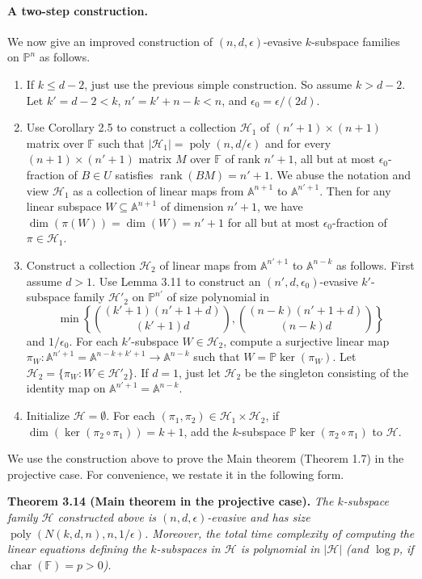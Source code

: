 \documentclass[10pt,a4paper]{article}
\newcommand{\FF}{\mathbb F}
\newcommand{\PP}{\mathbb P}
\newcommand{\Aspace}{\mathbb A}
\newenvironment{result}[1]{\par\medskip\noindent\textbf{#1.}\itshape}{\par\medskip}
\begin{document}
\paragraph{A two-step construction.}
We now give an improved construction of $(n,d,\epsilon)$-evasive $k$-subspace families on $\PP^n$ as follows.
\begin{enumerate}
\item If $k\le d-2$, just use the previous simple construction. So assume $k>d-2$. Let $k'=d-2<k$, $n'=k'+n-k<n$, and $\epsilon_0=\epsilon/(2d)$.
\item Use Corollary 2.5 to construct a collection $\mathcal H_1$ of $(n'+1)\times(n+1)$ matrix over $\FF$ such that $|\mathcal H_1|=\operatorname{poly}(n,d/\epsilon)$ and for every $(n+1)\times(n'+1)$ matrix $M$ over $\FF$ of rank $n'+1$, all but at most $\epsilon_0$-fraction of $B\in U$ satisfies $\operatorname{rank}(BM)=n'+1$.
We abuse the notation and view $\mathcal H_1$ as a collection of linear maps from $\Aspace^{n+1}$ to $\Aspace^{n'+1}$. Then for any linear subspace $W\subseteq\Aspace^{n+1}$ of dimension $n'+1$, we have $\dim(\pi(W))=\dim(W)=n'+1$ for all but at most $\epsilon_0$-fraction of $\pi\in\mathcal H_1$.
\item Construct a collection $\mathcal H_2$ of linear maps from $\Aspace^{n'+1}$ to $\Aspace^{n-k}$ as follows. First assume $d>1$. Use Lemma 3.11 to construct an $(n',d,\epsilon_0)$-evasive $k'$-subspace family $\mathcal H'_2$ on $\PP^{n'}$ of size polynomial in
\[\min\left\{\binom{(k'+1)(n'+1+d)}{(k'+1)d},\binom{(n-k)(n'+1+d)}{(n-k)d}\right\}\]
and $1/\epsilon_0$. For each $k'$-subspace $W\in\mathcal H_2$, compute a surjective linear map $\pi_W:\Aspace^{n'+1}=\Aspace^{n-k+k'+1}\to\Aspace^{n-k}$ such that $W=\PP\ker(\pi_W)$. Let $\mathcal H_2=\{\pi_W:W\in\mathcal H'_2\}$.
If $d=1$, just let $\mathcal H_2$ be the singleton consisting of the identity map on $\Aspace^{n'+1}=\Aspace^{n-k}$.
\item Initialize $\mathcal H=\emptyset$. For each $(\pi_1,\pi_2)\in\mathcal H_1\times\mathcal H_2$, if $\dim(\ker(\pi_2\circ\pi_1))=k+1$, add the $k$-subspace $\PP\ker(\pi_2\circ\pi_1)$ to $\mathcal H$.
\end{enumerate}
We use the construction above to prove the Main theorem (Theorem 1.7) in the projective case. For convenience, we restate it in the following form.
\begin{result}{Theorem 3.14 (Main theorem in the projective case)}
The $k$-subspace family $\mathcal H$ constructed above is $(n,d,\epsilon)$-evasive and has size $\operatorname{poly}(N(k,d,n),n,1/\epsilon)$. Moreover, the total time complexity of computing the linear equations defining the $k$-subspaces in $\mathcal H$ is polynomial in $|\mathcal H|$ (and $\log p$, if $\operatorname{char}(\FF)=p>0$).
\end{result}
\end{document}
